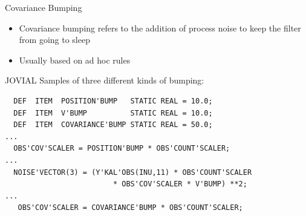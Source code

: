 \begin{frame}
Covariance Bumping
 \begin{itemize}
 \item Covariance bumping refers to the addition of process noise to keep the filter from going to sleep
 \item Usually based on ad hoc rules
\end{itemize}
\end{frame}

\begin{frame}[fragile]
JOVIAL Samples of three different kinds of bumping:
\begin{verbatim}
  DEF  ITEM  POSITION'BUMP   STATIC REAL = 10.0;
  DEF  ITEM  V'BUMP          STATIC REAL = 10.0;
  DEF  ITEM  COVARIANCE'BUMP STATIC REAL = 50.0;
...
  OBS'COV'SCALER = POSITION'BUMP * OBS'COUNT'SCALER;
...
  NOISE'VECTOR(3) = (Y'KAL'OBS(INU,11) * OBS'COUNT'SCALER 
                         * OBS'COV'SCALER * V'BUMP) **2;
...
   OBS'COV'SCALER = COVARIANCE'BUMP * OBS'COUNT'SCALER;
\end{verbatim}
\end{frame}
